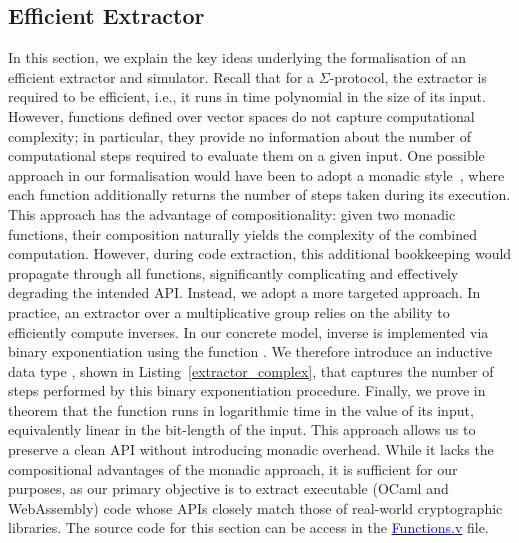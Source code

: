 \documentclass[sigconf, anonymous]{acmart}
\begin{document}
\subsection{Efficient Extractor}
In this section, we explain the key ideas underlying the formalisation of an efficient extractor and simulator. Recall that for a $\Sigma$-protocol, the extractor is required to be efficient, i.e., it runs in time polynomial in the size of its input. However, functions defined over vector spaces do not capture computational complexity; in particular, they provide no information about the number of computational steps required to evaluate them on a given input. One possible approach in our formalisation would have been to adopt a monadic style~\cite{10.1145/3473585,10.1145/3158124}, where each function additionally returns the number of steps taken during its execution. This approach has the advantage of compositionality: given two monadic functions, their composition naturally yields the complexity of the combined computation. However, during code extraction, this additional bookkeeping would propagate through all functions, significantly complicating and effectively degrading the intended API. Instead, we adopt a more targeted approach. In practice, an extractor over a multiplicative group relies on the ability to efficiently compute inverses. In our concrete model, inverse is implemented via binary exponentiation using the function \texttt{}. We therefore introduce an inductive data type \texttt{}, shown in Listing~\ref{extractor_complex}, that captures the number of steps performed by this binary exponentiation procedure. Finally, we prove in theorem \texttt{} that the function \texttt{} runs in logarithmic time in the value of its input, equivalently linear in the bit-length of the input. This approach allows us to preserve a clean API without introducing monadic overhead. While it lacks the compositional advantages of the monadic approach, it is sufficient for our purposes, as our primary objective is to extract executable (OCaml and WebAssembly) code whose APIs closely match those of real-world cryptographic libraries. The source code for this section can be access in the \href{https://anonymous.4open.science/r/SigmaProtocol-EBA5/src/Utility/Functions.v}{\textcolor{blue}{Functions.v}} file.
\end{document}
